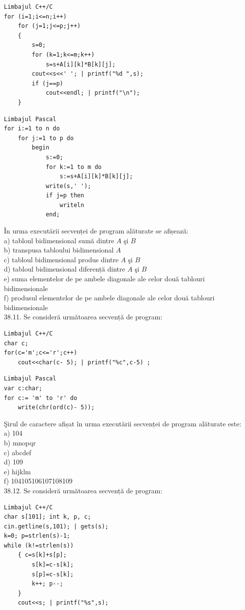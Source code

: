 \begin{itemize}
\begin{enumerate}
\begin{verbatim}
Limbajul C++/C
for (i=1;i<=n;i++)
    for (j=1;j<=p;j++)
    {
        s=0;
        for (k=1;k<=m;k++)
            s=s+A[i][k]*B[k][j];
        cout<<s<<' '; | printf("%d ",s);
        if (j==p)
            cout<<endl; | printf("\n");
    }
\end{verbatim}
\begin{verbatim}
Limbajul Pascal
for i:=1 to n do
    for j:=1 to p do
        begin
            s:=0;
            for k:=1 to m do
                s:=s+A[i][k]*B[k][j];
            write(s,' ');
            if j=p then
                writeln
            end;
\end{verbatim}
În urma executării secvenței de program alăturate se afișează:
\\
a) tabloul bidimensional sumă dintre $A$ şi $B$
\\
b) transpusa tabloului bidimensional $A$
\\
c) tabloul bidimensional produs dintre $A$ şi $B$
\\
d) tabloul bidimensional diferență dintre $A$ şi $B$
\\
e) suma elementelor de pe ambele diagonale ale celor două tablouri bidimensionale
\\
f) produsul elementelor de pe ambele diagonale ale celor două tablouri bidimensionale
\\
38.11. Se consideră următoarea secvență de program:
\begin{verbatim}
Limbajul C++/C
char c;
for(c='m';c<='r';c++)
    cout<<char(c- 5); | printf("%c",c-5) ;
\end{verbatim}
\begin{verbatim}
Limbajul Pascal
var c:char;
for c:= 'm' to 'r' do
    write(chr(ord(c)- 5));
\end{verbatim}
Şirul de caractere afișat în urma executării secvenței de program alăturate este:
\\
a) 104
\\
b) mnopqr
\\
c) abcdef
\\
d) 109
\\
e) hijklm
\\
f) 104105106107108109
\\
38.12. Se consideră următoarea secvență de program:
\begin{verbatim}
Limbajul C++/C
char s[101]; int k, p, c;
cin.getline(s,101); | gets(s);
k=0; p=strlen(s)-1;
while (k!=strlen(s))
    { c=s[k]+s[p];
        s[k]=c-s[k];
        s[p]=c-s[k];
        k++; p--;
    }
    cout<<s; | printf("%s",s);

\end{verbatim}
\end{enumerate}
\end{itemize}
